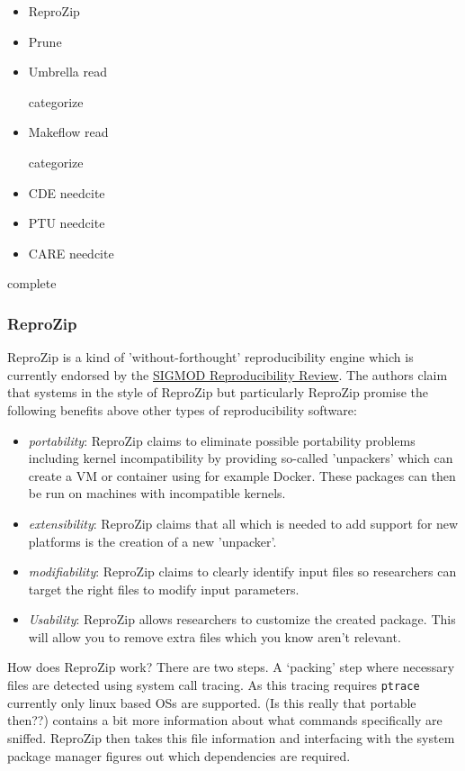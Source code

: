\documentclass[american]{article}
\newcommand{\Read}{
	\gls{read}
}
\newcommand{\categorize}{
	\gls{categorize}
}
\newcommand{\complete}{
	\gls{complete}
}
\newcommand{\needcite}{
	\gls{needcite}
}
\begin{document}
\begin{itemize}
\item ReproZip \cite{reprozip}
\item Prune \cite{Thain-Prune-2016}
\item Umbrella \cite{Thain-Umbrella-2016} \Read \categorize
\item Makeflow \cite{makeflow-2017} \Read \categorize
\item CDE \needcite
\item PTU \needcite
\item CARE \needcite
\end{itemize}

\complete

\subsubsection{ReproZip} \label{sec:reprozip}

ReproZip is a kind of 'without-forthought' reproducibility engine which is currently endorsed by the \href{http://db-reproducibility.seas.harvard.edu/}{SIGMOD Reproducibility Review}. The authors claim that systems in the style of ReproZip but particularly ReproZip promise the following benefits above other types of reproducibility software\cite{reprozip}:

\begin{itemize}
\item \textit{portability}: ReproZip claims to eliminate possible portability problems including kernel incompatibility by providing so-called 'unpackers' which can create a VM or container using for example Docker. These packages can then be run on machines with incompatible kernels.\cite{reprozip}
\item \textit{extensibility}: ReproZip claims that all which is needed to add support for new platforms is the creation of a new 'unpacker'.\cite{reprozip}
\item \textit{modifiability}: ReproZip claims to clearly identify input files so researchers can target the right files to modify input parameters.\cite{reprozip}
\item \textit{Usability}: ReproZip allows researchers to customize the created package. This will allow you to remove extra files which you know aren't relevant.\cite{reprozip}
\end{itemize}

How does ReproZip work? There are two steps. A `packing' step where necessary files are detected using system call tracing. As this tracing requires \texttt{ptrace} currently only linux based OSs are supported\cite{reprozip}. (Is this really that portable then??) \cite{reprozip} contains a bit more information about what commands specifically are sniffed. ReproZip then takes this file information and interfacing with the system package manager figures out which dependencies are required.
\end{document}

